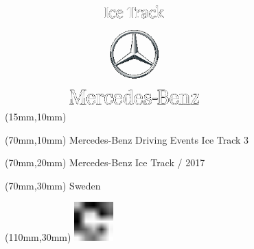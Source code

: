 \null\newpage
\begin{textblock*}{50mm}(15mm,10mm)%
\includegraphics[width=50mm]{LG/MER.png}
\end{textblock*}
\begin{textblock*}{130mm}(70mm,10mm)%
{\fontsize{20}{20}\selectfont Mercedes-Benz Driving Events Ice Track 3}\\
\end{textblock*}
\begin{textblock*}{120mm}(70mm,20mm)%
{\fontsize{16}{16}\selectfont Mercedes-Benz Ice Track / 2017}\\
\end{textblock*}
\begin{textblock*}{120mm}(70mm,30mm)%
{\fontsize{12}{12}\selectfont Sweden}
\end{textblock*}
\begin{textblock*}{30mm}(110mm,30mm)%
\centering
\includegraphics[height=15mm]{icons/fa-rotate-right.pdf}
\end{textblock*}
